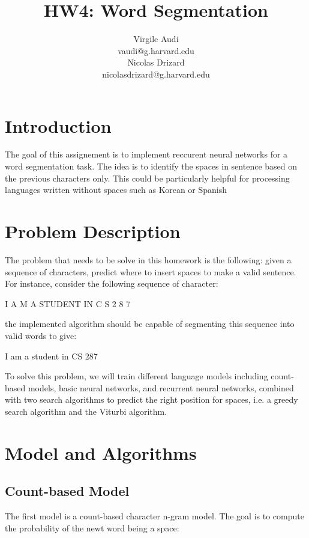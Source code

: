 \documentclass[11pt]{article}
\title{HW4: Word Segmentation}
\author{Virgile Audi \\ vaudi@g.harvard.edu \\ Nicolas Drizard \\ nicolasdrizard@g.harvard.edu}
\begin{document}
\maketitle{}
\section{Introduction}

The goal of this assignement is to implement reccurent neural networks for a word segmentation task. The idea is to identify the spaces in sentence based on the previous characters only. This could be particularly helpful for processing languages written without spaces such as Korean or Spanish


\section{Problem Description}

The problem that needs to be solve in this homework is the following: given a sequence of characters, predict where to insert spaces to make a valid sentence. For instance, consider the following sequence of character:
\begin{center}
I A M A STUDENT IN C S 2 8 7\\
\end{center}
the implemented algorithm should be capable of segmenting this sequence into valid words to give:
\begin{center}
I am a student in CS 287\\
\end{center}

\noindent To solve this problem, we will train different language models including count-based models, basic neural networks, and recurrent neural networks, combined with two search algorithms to predict the right position for spaces, i.e. a greedy search algorithm and the Viturbi algorithm. 


\section{Model and Algorithms}

\subsection{Count-based Model}

The first model is a count-based character n-gram model. The goal is to compute the probability of the newt word being a space:
\end{document}
